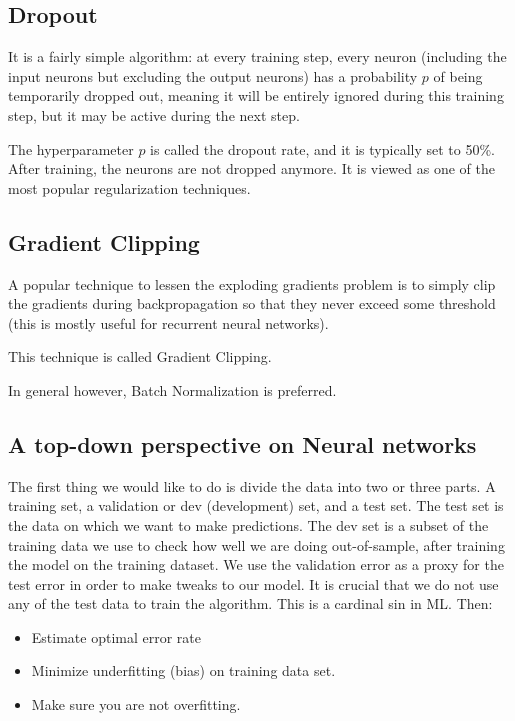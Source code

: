 \documentclass[%
oneside,                 %
final,                   %
10pt]{article}
\begin{document}
\subsection{Dropout}

It is a fairly simple algorithm: at every training step, every neuron
(including the input neurons but excluding the output neurons) has a
probability $p$ of being temporarily dropped out, meaning it will be
entirely ignored during this training step, but it may be active
during the next step.

The hyperparameter $p$ is called the dropout rate, and it is typically
set to 50\%. After training, the neurons are not dropped anymore.  It
is viewed as one of the most popular regularization techniques.

\subsection{Gradient Clipping}

A popular technique to lessen the exploding gradients problem is to
simply clip the gradients during backpropagation so that they never
exceed some threshold (this is mostly useful for recurrent neural
networks).

This technique is called Gradient Clipping.

In general however, Batch
Normalization is preferred.

\subsection{A top-down perspective on Neural networks}

The first thing we would like to do is divide the data into two or
three parts. A training set, a validation or dev (development) set,
and a test set. The test set is the data on which we want to make
predictions. The dev set is a subset of the training data we use to
check how well we are doing out-of-sample, after training the model on
the training dataset. We use the validation error as a proxy for the
test error in order to make tweaks to our model. It is crucial that we
do not use any of the test data to train the algorithm. This is a
cardinal sin in ML. Then:

\begin{itemize}
\item Estimate optimal error rate

\item Minimize underfitting (bias) on training data set.

\item Make sure you are not overfitting.
\end{itemize}
\end{document}

